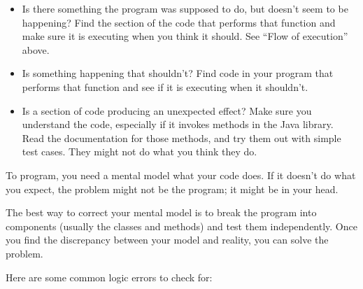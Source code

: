\documentclass[12pt]{book}
\theoremstyle{exercise}
\begin{document}
\begin{itemize}

\item Is there something the program was supposed to do, but doesn't seem to be happening?
Find the section of the code that performs that function and make sure it is executing when you think it should.
See ``Flow of execution'' above.

\item Is something happening that shouldn't?
Find code in your program that performs that function and see if it is executing when it shouldn't.

\item Is a section of code producing an unexpected effect?
Make sure you understand the code, especially if it invokes methods in the Java library.
Read the documentation for those methods, and try them out with simple test cases.
They might not do what you think they do.

\end{itemize}

To program, you need a mental model what your code does.  If it doesn't do what you expect, the problem might not be the program; it might be in your head.

The best way to correct your mental model is to break the program into components (usually the classes and methods) and test them independently.  Once you find the discrepancy between your model and reality, you can solve the problem.

Here are some common logic errors to check for:
\end{document}
